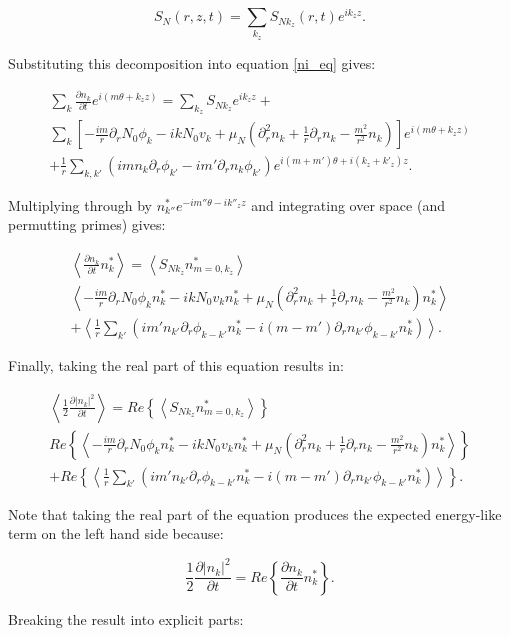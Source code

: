 \documentclass[12pt]{article}
\def\beq{\begin{equation}}
\def\eeq{\end{equation}}
\def\beqar{\begin{eqnarray}}
\def\eeqar{\end{eqnarray}}
\newcommand{\pdiff}[2]{\frac{\partial#1}{\partial#2}}
\newcommand{\pdr}{\partial_r}
\newcommand{\pdrr}{\partial^2_r}
\begin{document}
\beq
\label{source_decomp}
S_N(r,z,t) = \sum_{k_z} S_{N k_z}(r,t) e^{i k_z z}.
\eeq

Substituting this decomposition into equation \ref{ni_eq} gives:

\beqar
\label{density_eq_fourier}
\sum_{k} \pdiff{n_k}{t} e^{i(m \theta + k_z z)} = \sum_{k_z} S_{N k_z} e^{i k_z z} + \nonumber \\
\sum_{k} \left[ -\frac{i m}{r} \pdr N_0 \phi_k - i k N_0 v_k + \mu_N(\pdrr n_k + \frac{1}{r} \pdr n_k - \frac{m^2}{r^2} n_k) \right] e^{i(m \theta + k_z z)} \nonumber \\
+ \frac{1}{r} \sum_{k,k'} (i m n_k \pdr \phi_{k'} - i m' \pdr n_k \phi_{k'}) e^{i (m + m') \theta + i (k_z + k'_z) z}.
\eeqar

Multiplying through by $n_{k''}^* e^{- i m'' \theta - i k''_z z}$ and integrating over space (and permutting primes) gives:

\beqar
\label{density_evolution}
\left< \pdiff{n_k}{t} n_k^* \right> = \left< S_{N k_z} n_{m=0,k_z}^* \right>  \nonumber \\
\left< -\frac{i m}{r} \pdr N_0 \phi_k n_k^* - i k N_0 v_k n_k^* + \mu_N( \pdrr n_k + \frac{1}{r} \pdr n_k - \frac{m^2}{r^2} n_k) n_k^*  \right> \nonumber \\
+ \left< \frac{1}{r} \sum_{k'} \left( i m' n_{k'} \pdr \phi_{k-k'} n_k^*  - i (m - m') \pdr n_{k'} \phi_{k-k'} n_k^*        \right) \right>.
\eeqar

Finally, taking the real part of this equation results in:

\beqar
\label{real_density_evolution}
\left< \frac{1}{2} \pdiff{|n_k|^2}{t} \right> = Re \left\{ \left< S_{N k_z} n_{m=0,k_z}^* \right> \right\} \nonumber \\
Re \left\{ \left< -\frac{i m}{r} \pdr N_0 \phi_k n_k^* - i k N_0 v_k n_k^* + \mu_N( \pdrr n_k + \frac{1}{r} \pdr n_k - \frac{m^2}{r^2} n_k) n_k^* \right> \right\} \nonumber \\
+ Re \left\{ \left< \frac{1}{r} \sum_{k'} \left( i m' n_{k'} \pdr \phi_{k-k'} n_k^*  - i (m - m') \pdr n_{k'} \phi_{k-k'} n_k^*        \right) \right> \right\}.
\eeqar

Note that taking the real part of the equation produces the expected energy-like term on the left hand side because:

\beq
\frac{1}{2} \pdiff{|n_k|^2}{t} = Re \left\{ \pdiff{n_k}{t} n_k^* \right\}.
\eeq

Breaking the result into explicit parts:
\end{document}
